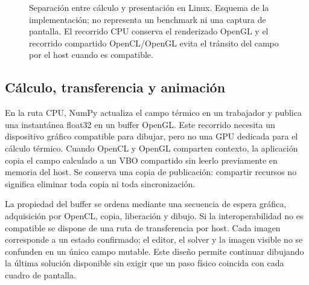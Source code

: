 \documentclass[11pt,a4paper]{article}
\begin{document}
\begin{figure}[tbp]\centering
{}
\caption{Separación entre cálculo y presentación en Linux. Esquema de la implementación; no representa un benchmark ni una captura de pantalla. El recorrido CPU conserva el renderizado OpenGL y el recorrido compartido OpenCL/OpenGL evita el tránsito del campo por el host cuando es compatible.}\label{fig:pipeline}
\end{figure}

\subsection{Cálculo, transferencia y animación}
En la ruta CPU, NumPy actualiza el campo térmico en un trabajador y publica una instantánea float32 en un buffer OpenGL. Este recorrido necesita un dispositivo gráfico compatible para dibujar, pero no una GPU dedicada para el cálculo térmico. Cuando OpenCL y OpenGL comparten contexto, la aplicación copia el campo calculado a un VBO compartido sin leerlo previamente en memoria del host. Se conserva una copia de publicación: compartir recursos no significa eliminar toda copia ni toda sincronización.

La propiedad del buffer se ordena mediante una secuencia de espera gráfica, adquisición por OpenCL, copia, liberación y dibujo. Si la interoperabilidad no es compatible se dispone de una ruta de transferencia por host. Cada imagen corresponde a un estado confirmado; el editor, el solver y la imagen visible no se confunden en un único campo mutable. Este diseño permite continuar dibujando la última solución disponible sin exigir que un paso físico coincida con cada cuadro de pantalla.
\end{document}
